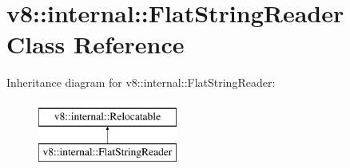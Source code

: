 \hypertarget{classv8_1_1internal_1_1FlatStringReader}{}\section{v8\+:\+:internal\+:\+:Flat\+String\+Reader Class Reference}
\label{classv8_1_1internal_1_1FlatStringReader}
Inheritance diagram for v8\+:\+:internal\+:\+:Flat\+String\+Reader\+:\begin{figure}[H]
\begin{center}
\leavevmode
\includegraphics[height=2.000000cm]{classv8_1_1internal_1_1FlatStringReader}
\end{center}
\end{figure}
